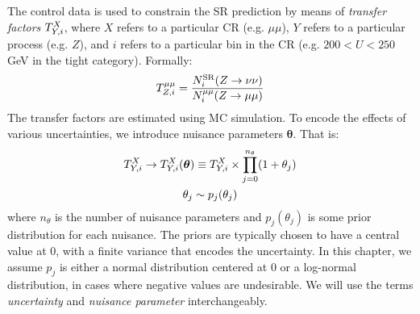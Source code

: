 The control data is used to constrain the SR prediction by means of \emph{transfer factors} ${T}^{X}_{Y,i}$, where $X$ refers to a particular CR (e.g. $\mu\mu$), $Y$ refers to a particular process (e.g. $Z$), and $i$ refers to a particular bin in the CR (e.g. $200<U<250$ GeV in the tight category).
Formally:
\begin{equation}
    {T}^{\mu\mu}_{Z,i} = \frac{N^\mathrm{SR}_i(Z\rightarrow\nu\nu)}{N^{\mu\mu}_i(Z\rightarrow\mu\mu)}
\end{equation}
The transfer factors are estimated using MC simulation.
To encode the effects of various uncertainties, we introduce nuisance parameters $\bm{\theta}$.
That is:
\begin{gather}
    {T}^{X}_{Y,i} \rightarrow {T}^{X}_{Y,i}(\bm\theta) \equiv {T}^{X}_{Y,i} \times \prod_{j=0}^{n_\theta} (1+\theta_j) \\
    \theta_j \sim p_j(\theta_j)
\end{gather}
where $n_\theta$ is the number of nuisance parameters and $p_j(\theta_j)$ is some prior distribution for each nuisance.
The priors are typically chosen to have a central value at $0$, with a finite variance that encodes the uncertainty.
In this chapter, we assume $p_j$ is either a normal distribution centered at 0 or a log-normal distribution, in cases where negative values are undesirable.
We will use the terms \emph{uncertainty} and \emph{nuisance parameter} interchangeably.


